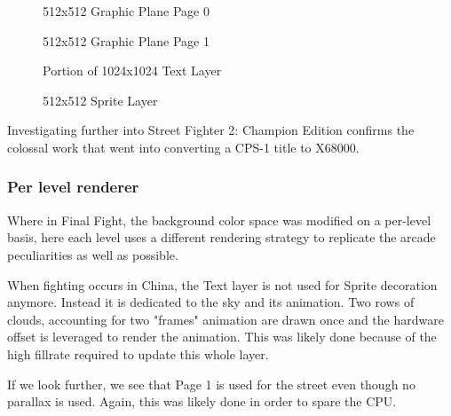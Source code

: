 \vspace{-4ex}
\begin{minipage}[t]{0.49\linewidth}
  \begin{figure}[H]
  \caption*{512x512 Graphic Plane Page 0}
  \end{figure}
\end{minipage}%
\hfill
\begin{minipage}[t]{0.49\linewidth}
  \begin{figure}[H]
  \caption*{512x512 Graphic Plane Page 1}
  \end{figure}
\end{minipage}%

\begin{minipage}[t]{0.49\linewidth}
  \begin{figure}[H]
  \caption*{Portion of 1024x1024 Text Layer}
  \end{figure}
\end{minipage}%
\hfill
\begin{minipage}[t]{0.49\linewidth}
   \begin{figure}[H]
  \caption*{512x512 Sprite Layer}
  \end{figure}
\end{minipage}%

\pagebreak

Investigating further into Street Fighter 2: Champion Edition confirms the colossal work that went into converting a CPS-1 title to X68000. 

\subsubsection{Per level renderer}
Where in Final Fight, the background color space was modified on a per-level basis, here each level uses a different rendering strategy to replicate the arcade peculiarities as well as possible.

When fighting occurs in China, the Text layer is not used for Sprite decoration anymore. Instead it is dedicated to the sky and its animation. Two rows of clouds, accounting for two "frames" animation are drawn once and the hardware offset is leveraged to render the animation. This was likely done because of the high fillrate required to update this whole layer.


If we look further, we see that Page 1 is used for the street even though no parallax is used. Again, this was likely done in order to spare the CPU.

